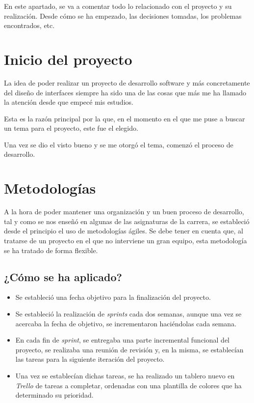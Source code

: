En este apartado, se va a comentar todo lo relacionado con el proyecto y su realización. Desde cómo se ha empezado, las decisiones tomadas, los problemas encontrados, etc.

\section{Inicio del proyecto}
La idea de poder realizar un proyecto de desarrollo software y más concretamente del diseño de interfaces siempre ha sido una de las cosas que más me ha llamado la atención desde que empecé mis estudios. 

Esta es la razón principal por la que, en el momento en el que me puse a buscar un tema para el proyecto, este fue el elegido.

Una vez se dio el visto bueno y se me otorgó el tema, comenzó el proceso de desarrollo.


\section{Metodologías}
A la hora de poder mantener una organización y un buen proceso de desarrollo, tal y como se nos enseñó en algunas de las asignaturas de la carrera, se estableció desde el principio el uso de metodologías ágiles. Se debe tener en cuenta que, al tratarse de un proyecto en el que no interviene un gran equipo, esta metodología se ha tratado de forma flexible.

\subsection{¿Cómo se ha aplicado?}
\begin{itemize}
    \item Se estableció una fecha objetivo para la finalización del proyecto.
    \item Se estableció la realización de \textit{sprints} cada dos semanas, aunque una vez se acercaba la fecha de objetivo, se incrementaron haciéndolas cada semana.
    \item En cada fin de \textit{sprint}, se entregaba una parte incremental funcional del proyecto, se realizaba una reunión de revisión y, en la misma, se establecían las tareas para la siguiente iteración del proyecto.
    \item Una vez se establecían dichas tareas, se ha realizado un tablero nuevo en \textit{Trello} de tareas a completar, ordenadas con una plantilla de colores que ha determinado su prioridad.
\end{itemize}

